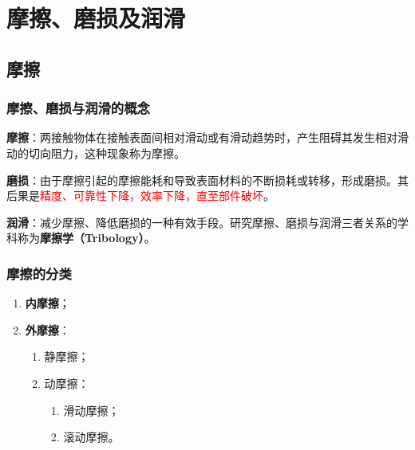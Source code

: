 \chapter{摩擦、磨损及润滑}
\label{chap:摩擦磨损及润滑}

\section{摩擦}
\label{sec:摩擦}

\subsection{摩擦、磨损与润滑的概念}

\begin{definition}[摩擦]
\label{def:摩擦}
\textbf{摩擦}：两接触物体在接触表面间相对滑动或有滑动趋势时，产生阻碍其发生相对滑动的切向阻力，这种现象称为摩擦。
\end{definition}

\begin{definition}[磨损]
\label{def:磨损}
\textbf{磨损}：由于摩擦引起的摩擦能耗和导致表面材料的不断损耗或转移，形成磨损。其后果是\textcolor{red}{精度、可靠性下降，效率下降，直至部件破坏}。
\end{definition}

\begin{definition}[润滑]
\label{def:润滑}
\textbf{润滑}：减少摩擦、降低磨损的一种有效手段。研究摩擦、磨损与润滑三者关系的学科称为\textbf{摩擦学（Tribology）}。
\end{definition}

\subsection{摩擦的分类}

\begin{definition}[摩擦的分类]
\label{def:摩擦分类}
\begin{enumerate}
	\item \textbf{内摩擦}；
	\item \textbf{外摩擦}：
	\begin{enumerate}
		\item 静摩擦；
		\item 动摩擦：
		\begin{enumerate}
			\item 滑动摩擦；
			\item 滚动摩擦。
		\end{enumerate}
	\end{enumerate}
\end{enumerate}
\end{definition}

